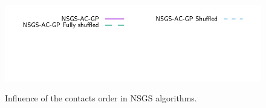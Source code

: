 \begin{figure}
 \\
{\includegraphics[height=\legendheight]{figure/NSGS/Shuffled/1.0e-08/50/time/profile-Chain_legend.pdf}} 
\caption{Influence of the contacts order in NSGS algorithms.}
\label{fig:NSGS/Shuffled}
\end{figure}

